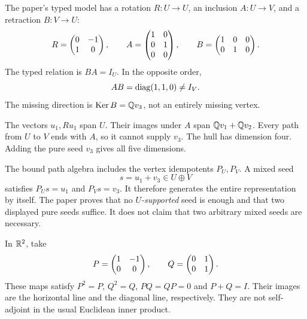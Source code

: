
The paper's typed model has a rotation $R:U\to U$, an inclusion $A:U\to V$, and a retraction $B:V\to U$:
\[
R=\begin{pmatrix}0&-1\\1&0\end{pmatrix},\qquad
A=\begin{pmatrix}1&0\\0&1\\0&0\end{pmatrix},\qquad
B=\begin{pmatrix}1&0&0\\0&1&0\end{pmatrix}.
\]
The typed relation is $BA=I_U$. In the opposite order,
\[
AB=\operatorname{diag}(1,1,0)\ne I_V.
\]
The missing direction is $\operatorname{Ker} B=\mathbb Q v_3$, not an entirely missing vertex.


The vectors $u_1,Ru_1$ span $U$. Their images under $A$ span $\mathbb Q v_1+\mathbb Q v_2$. Every path from $U$ to $V$ ends with $A$, so it cannot supply $v_3$. The hull has dimension four. Adding the pure seed $v_3$ gives all five dimensions.

The bound path algebra includes the vertex idempotents $P_U,P_V$. A mixed seed
\[
s=u_1+v_3\in U\oplus V
\]
satisfies $P_Us=u_1$ and $P_Vs=v_3$. It therefore generates the entire representation by itself. The paper proves that no \emph{$U$-supported} seed is enough and that two displayed pure seeds suffice. It does not claim that two arbitrary mixed seeds are necessary.


In $\mathbb R^2$, take
\[
P=\begin{pmatrix}1&-1\\0&0\end{pmatrix},\qquad Q=\begin{pmatrix}0&1\\0&1\end{pmatrix}.
\]
These maps satisfy $P^2=P$, $Q^2=Q$, $PQ=QP=0$ and $P+Q=I$. Their images are the horizontal line and the diagonal line, respectively. They are not self-adjoint in the usual Euclidean inner product.

